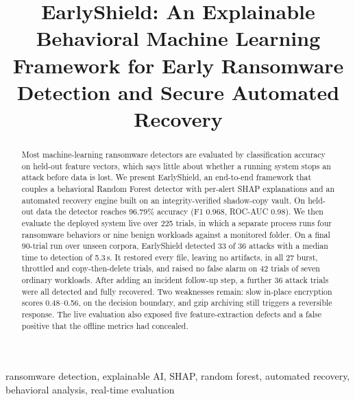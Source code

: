 \documentclass[conference]{IEEEtran}
\begin{document}
\title{EarlyShield: An Explainable Behavioral Machine Learning Framework for Early Ransomware Detection and Secure Automated Recovery}

\author{
\and
{}
}

\maketitle

\begin{abstract}
Most machine-learning ransomware detectors are evaluated by classification accuracy on held-out feature vectors, which says little about whether a running system stops an attack before data is lost. We present EarlyShield, an end-to-end framework that couples a behavioral Random Forest detector with per-alert SHAP explanations and an automated recovery engine built on an integrity-verified shadow-copy vault. On held-out data the detector reaches 96.79\% accuracy (F1 0.968, ROC-AUC 0.98). We then evaluate the deployed system live over 225 trials, in which a separate process runs four ransomware behaviors or nine benign workloads against a monitored folder. On a final 90-trial run over unseen corpora, EarlyShield detected 33 of 36 attacks with a median time to detection of 5.3\,s. It restored every file, leaving no artifacts, in all 27 burst, throttled and copy-then-delete trials, and raised no false alarm on 42 trials of seven ordinary workloads. After adding an incident follow-up step, a further 36 attack trials were all detected and fully recovered. Two weaknesses remain: slow in-place encryption scores 0.48--0.56, on the decision boundary, and gzip archiving still triggers a reversible response. The live evaluation also exposed five feature-extraction defects and a false positive that the offline metrics had concealed.
\end{abstract}

\begin{IEEEkeywords}
ransomware detection, explainable AI, SHAP, random forest, automated recovery, behavioral analysis, real-time evaluation
\end{IEEEkeywords}
\end{document}
